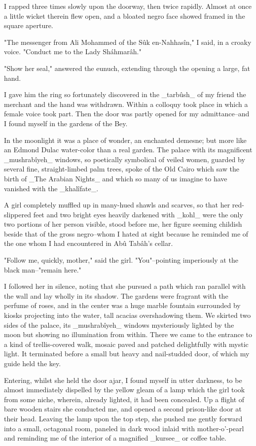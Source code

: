 I rapped three times slowly upon the doorway, then twice rapidly.
Almost at once a little wicket therein flew open, and a bloated negro
face showed framed in the square aperture.

"The messenger from Ali Mohammed of the Sûk en-Nahhasîn," I said, in
a croaky voice. "Conduct me to the Lady Sháhmarâh."

"Show her seal," answered the eunuch, extending through the opening
a large, fat hand.

I gave him the ring so fortunately discovered in the _tarbûsh_ of my
friend the merchant and the hand was withdrawn. Within a colloquy took
place in which a female voice took part. Then the door was partly
opened for my admittance--and I found myself in the gardens of the
Bey.

In the moonlight it was a place of wonder, an enchanted demesne; but
more like an Edmond Dulac water-color than a real garden. The palace
with its magnificent _mushrabîyeh_ windows, so poetically symbolical
of veiled women, guarded by several fine, straight-limbed palm trees,
spoke of the Old Cairo which saw the birth of _The Arabian Nights_
and which so many of us imagine to have vanished with the _khalîfate_.

A girl completely muffled up in many-hued shawls and scarves, so that
her red-slippered feet and two bright eyes heavily darkened with
_kohl_ were the only two portions of her person visible, stood before
me, her figure seeming childish beside that of the gross negro--whom
I hated at sight because he reminded me of the one whom I had
encountered in Abû Tabâh's cellar.

"Follow me, quickly, mother," said the girl. "You"--pointing
imperiously at the black man--"remain here."

I followed her in silence, noting that she pursued a path which ran
parallel with the wall and lay wholly in its shadow. The gardens were
fragrant with the perfume of roses, and in the center was a huge
marble fountain surrounded by kiosks projecting into the water, tall
acacias overshadowing them. We skirted two sides of the palace, its
_mushrabîyeh_ windows mysteriously lighted by the moon but showing no
illumination from within. There we came to the entrance to a kind of
trellis-covered walk, mosaic paved and patched delightfully with
mystic light. It terminated before a small but heavy and nail-studded
door, of which my guide held the key.

Entering, whilst she held the door ajar, I found myself in utter
darkness, to be almost immediately dispelled by the yellow gleam of
a lamp which the girl took from some niche, wherein, already lighted,
it had been concealed. Up a flight of bare wooden stairs she conducted
me, and opened a second prison-like door at their head. Leaving the
lamp upon the top step, she pushed me gently forward into a small,
octagonal room, paneled in dark wood inlaid with mother-o'-pearl and
reminding me of the interior of a magnified _kursee_ or coffee table.

